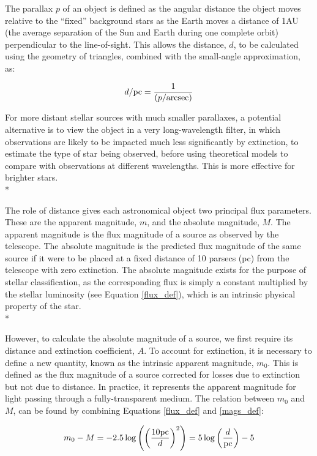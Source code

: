 \documentclass[12pt, a4paper]{report}
\begin{document}
The parallax $p$ of an object is defined as the angular distance the object moves relative to the ``fixed'' background stars as the Earth moves a distance of 1AU (the average separation of the Sun and Earth during one complete orbit) perpendicular to the line-of-sight. This allows the distance, $d$, to be calculated using the geometry of triangles, combined with the small-angle approximation, as:

\begin{equation}
d/\textnormal{pc} = \frac{1}{(p/\textnormal{arcsec})}
\end{equation}

For more distant stellar sources with much smaller parallaxes, a potential alternative is to view the object in a very long-wavelength filter, in which observations are likely to be impacted much less significantly by extinction, to estimate the type of star being observed, before using theoretical models to compare with observations at different wavelengths. This is more effective for brighter stars. \\*

The role of distance gives each astronomical object two principal flux parameters. These are the apparent magnitude, $m$, and the absolute magnitude, $M$. The apparent magnitude is the flux magnitude of a source as observed by the telescope. The absolute magnitude is the predicted flux magnitude of the same source if it were to be placed at a fixed distance of 10 parsecs (pc) from the telescope with zero extinction. The absolute magnitude exists for the purpose of stellar classification, as the corresponding flux is simply a constant multiplied by the stellar luminosity (see Equation \ref{flux_def}), which is an intrinsic physical property of the star. \\*

However, to calculate the absolute magnitude of a source, we first require its distance and extinction coefficient, $A$. To account for extinction, it is necessary to define a new quantity, known as the intrinsic apparent magnitude, $m_{0}$. This is defined as the flux magnitude of a source corrected for losses due to extinction but not due to distance. In practice, it represents the apparent magnitude for light passing through a fully-transparent medium. The relation between $m_{0}$ and $M$, can be found by combining Equations \ref{flux_def} and \ref{mags_def}:

\begin{equation}
\label{distance_modulus}
m_{0} - M = -2.5\log \left( \left(\frac{10\textnormal{pc}}{d}\right)^{2} \right) = 5\log\left(\frac{d}{\textnormal{pc}}\right) - 5
\end{equation}
\end{document}
